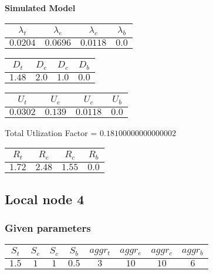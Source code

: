 \documentclass{article}
\begin{document}
\begin{minipage}{0.5\textwidth}
\centering	\textbf{Simulated Model}
\begin{table}[H]
\centering
\begin{tabular}{@{}cccc@{}}
\toprule
$\lambda_t$ & $\lambda_e$ & $\lambda_c$ & $\lambda_b$\\
\midrule
$0.0204$ & $0.0696$ & $0.0118$ & $0.0$\\
\bottomrule
\end{tabular}
\end{table}
\begin{table}[H]
\centering
\begin{tabular}{@{}cccc@{}}
\toprule
$D_t$ & $D_e$ & $D_c$ & $D_b$\\
\midrule
$1.48$ & $2.0$ & $1.0$ & $0.0$\\
\bottomrule
\end{tabular}
\end{table}\begin{table}[H]
\centering
\begin{tabular}{@{}cccc@{}}
\toprule
$U_t$ & $U_e$ & $U_c$ & $U_b$\\
\midrule
$0.0302$ & $0.139$ & $0.0118$ & $0.0$\\
\bottomrule
\end{tabular}
\end{table}
\centering Total Utlization Factor = $0.18100000000000002$
\begin{table}[H]
\centering
\begin{tabular}{@{}cccc@{}}
\toprule
$R_t$ & $R_e$ & $R_c$ & $R_b$\\
\midrule
$1.72$ & $2.48$ & $1.55$ & $0.0$\\
\bottomrule
\end{tabular}
\end{table}
\end{minipage}
\newpage\subsection{Local node 4}
\subsubsection{Given parameters}
\begin{table}[H]
\centering
\begin{tabular}{@{}cccc|cccc@{}}
\toprule
$S_t$ & $S_e$ & $S_c$ & $S_b$ & $aggr_t$ & $aggr_e$ & $aggr_c$ & $aggr_b$\\
\midrule
$1.5$ & $1$ & $1$ & $0.5$ & $3$ & $10$ & $10$ & $6$\\
\bottomrule
\end{tabular}
\end{table}
\end{document}
